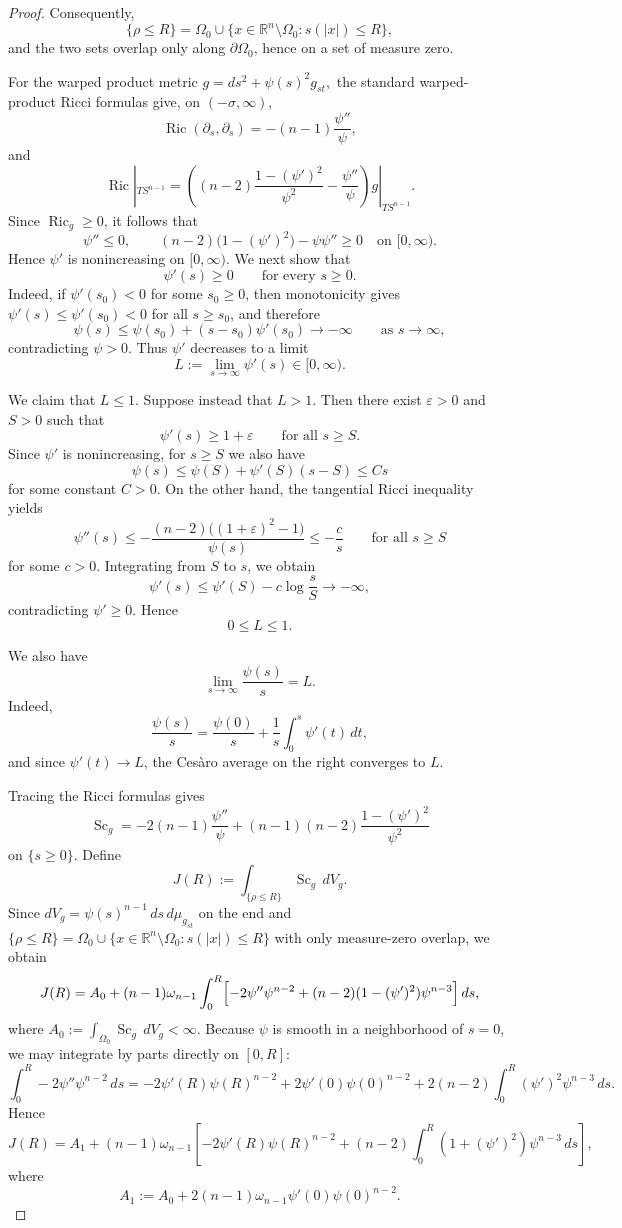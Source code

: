 \documentclass[12pt,oneside,a4paper]{article}
\theoremstyle{mytheorem}
\theoremstyle{remark}
\begin{document}
\begin{proof}
Consequently,
\[
\{\rho \le R\} = \Omega_0 \cup \{x \in \mathbb{R}^n \setminus \Omega_0 : s(|x|) \le R\},
\]
and the two sets overlap only along $\partial\Omega_0$, hence on a set of
measure zero.


For the warped product metric $g=ds^2+\psi(s)^2g_{st},$
the standard warped-product Ricci formulas give, on $(-\sigma,\infty)$,
\[
\operatorname{Ric}(\partial_s,\partial_s)=-(n-1)\frac{\psi''}{\psi},
\]
and
\[
\operatorname{Ric}|_{TS^{n-1}}
=
\left((n-2)\frac{1-(\psi')^2}{\psi^2}-\frac{\psi''}{\psi}\right)
g|_{TS^{n-1}}.
\]
Since $\operatorname{Ric}_g\ge 0$, it follows that
\[
\psi''\le 0,
\qquad
(n-2)\bigl(1-(\psi')^2\bigr)-\psi\psi''\ge 0
\quad\text{on }[0,\infty).
\]
Hence $\psi'$ is nonincreasing on $[0,\infty)$. We next show that
\[
\psi'(s)\ge 0\qquad\text{for every }s\ge 0.
\]
Indeed, if $\psi'(s_0)<0$ for some $s_0\ge 0$, then monotonicity gives
$\psi'(s)\le \psi'(s_0)<0$ for all $s\ge s_0$, and therefore
\[
\psi(s)\le \psi(s_0)+(s-s_0)\psi'(s_0)\to -\infty
\qquad\text{as }s\to\infty,
\]
contradicting $\psi>0$. Thus $\psi'$ decreases to a limit
\[
L:=\lim_{s\to\infty}\psi'(s)\in[0,\infty).
\]

We claim that $L\le 1$. Suppose instead that $L>1$. Then there exist
$\varepsilon>0$ and $S>0$ such that
\[
\psi'(s)\ge 1+\varepsilon\qquad\text{for all }s\ge S.
\]
Since $\psi'$ is nonincreasing, for $s\ge S$ we also have
\[
\psi(s)\le \psi(S)+\psi'(S)(s-S)\le Cs
\]
for some  constant $C>0$. On the other hand, the tangential Ricci inequality yields
\[
\psi''(s)
\le -\frac{(n-2)\bigl((1+\varepsilon)^2-1\bigr)}{\psi(s)}
\le -\frac{c}{s}
\qquad\text{for all }s\ge S
\]
for some $c>0$. Integrating from $S$ to $s$, we obtain
\[
\psi'(s)\le \psi'(S)-c\log\frac{s}{S}\to -\infty,
\]
contradicting $\psi'\ge 0$. Hence
\[
0\le L\le 1.
\]

We also have
\[
\lim_{s\to\infty}\frac{\psi(s)}{s}=L.
\]
Indeed,
\[
\frac{\psi(s)}{s}
=
\frac{\psi(0)}{s}
+
\frac1s\int_0^s \psi'(t)\,dt,
\]
and since $\psi'(t)\to L$, the Ces\`aro average on the right converges to $L$.


Tracing the Ricci formulas gives
\[
\operatorname{Sc}_g
=
-2(n-1)\frac{\psi''}{\psi}
+
(n-1)(n-2)\frac{1-(\psi')^2}{\psi^2}
\]
on $\{s\ge 0\}$. Define
\[
J(R):=\int_{\{\rho\le R\}} \operatorname{Sc}_g\,dV_g.
\]
Since $dV_g=\psi(s)^{n-1}\,ds\,d\mu_{g_{st}}$
on the end and $
\{\rho \le R\} = \Omega_0 \cup \{x \in \mathbb{R}^n \setminus \Omega_0 : s(|x|) \le R\}$ with only measure-zero overlap, we obtain
\[
J(R)
=
A_0
+
(n-1)\omega_{n-1}\int_0^R
\Bigl[
-2\psi''\psi^{n-2}
+
(n-2)(1-(\psi')^2)\psi^{n-3}
\Bigr]\,ds,
\]
where $A_0:=\int_{\Omega_0}\operatorname{Sc}_g\,dV_g<\infty.$ Because $\psi$ is smooth in a neighborhood of $s=0$, we may integrate by parts
directly on $[0,R]$:
\[
\int_0^R -2\psi''\psi^{n-2}\,ds
=
-2\psi'(R)\psi(R)^{n-2}
+
2\psi'(0)\psi(0)^{n-2}
+
2(n-2)\int_0^R(\psi')^2\psi^{n-3}\,ds.
\]
Hence
\begin{equation}\label{eq:global-conformal-J}
J(R)
=
A_1
+
(n-1)\omega_{n-1}
\left[
-2\psi'(R)\psi(R)^{n-2}
+
(n-2)\int_0^R(1+(\psi')^2)\psi^{n-3}\,ds
\right],
\end{equation}
where
\[
A_1:=A_0+2(n-1)\omega_{n-1}\psi'(0)\psi(0)^{n-2}.
\]



\end{proof}
\end{document}
